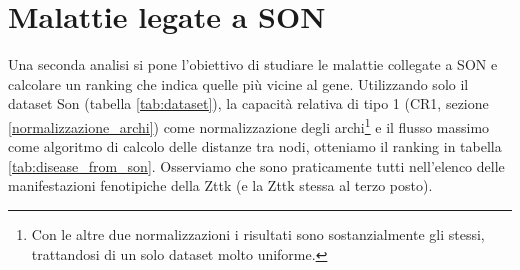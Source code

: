 \documentclass[12pt]{report}
\begin{document}
\FloatBarrier
\section{Malattie legate a SON}
Una seconda analisi si pone l'obiettivo di studiare le malattie collegate a SON e calcolare un ranking che indica quelle più vicine al gene. Utilizzando solo il dataset Son (tabella \ref{tab:dataset}), la capacità relativa di tipo 1 (CR1, sezione \ref{normalizzazione_archi}) come normalizzazione degli archi\footnote{Con le altre due normalizzazioni i risultati sono sostanzialmente gli stessi, trattandosi di un solo dataset molto uniforme.} e il flusso massimo come algoritmo di calcolo delle distanze tra nodi, otteniamo il ranking in tabella \ref{tab:disease_from_son}. Osserviamo che sono praticamente tutti nell'elenco delle manifestazioni fenotipiche della Zttk \cite{zttkmalasymtoms} (e la Zttk stessa al terzo posto). 
\end{document}
